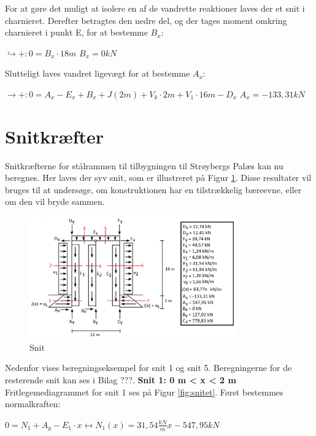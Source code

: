 For at gøre det muligt at isolere en af de vandrette reaktioner laves der et snit i charnieret. Derefter betragtes den nedre del, og der tages moment omkring charnieret i punkt E, for at bestemme $B_x$:
\begin{center}
	$\hookrightarrow+: 0 = B_x \cdot 18m$
	\newline
	$B_x = 0 kN$
\end{center}

Slutteligt laves vandret ligevægt for at bestemme $A_x$:
\begin{center}
	$\rightarrow+: 0 = A_x - E_x + B_x + J(2m) + V_k \cdot 2m + V_1 \cdot 16 m - D_x$
	\newline
	$A_x = -133,\!31 kN$
\end{center} 

\section{Snitkræfter}
Snitkræfterne for stålrammen til tilbygningen til Strøybergs Palæs kan nu beregnes. Her laves der syv snit, som er illustreret på Figur \ref{fig:snitbrud}. Disse resultater vil bruges til at undersøge, om konstruktionen har en tilstrækkelig bæreevne, eller om den vil bryde sammen. 

\begin{figure}[H]
	\centering
	\includegraphics[width=0.8\textwidth]{billeder/snitbrud.png}
	\caption{Snit}
	\label{fig:snitbrud}
\end{figure}

Nedenfor vises beregningseksempel for snit 1 og snit 5. Beregningerne for de resterende snit kan ses i Bilag ???. 
\newline
\newline
\textbf{Snit 1: 0 m < x < 2 m}
\newline
Fritlegemediagrammet for snit 1 ses på Figur \ref{fig:snitet}.
\newline
\newline
Først bestemmes normalkraften:
\begin{center}
	$0 = N_1 + A_y - E_1 \cdot x \leftrightarrow N_1(x) = 31,\!54 \frac{kN}{m} x - 547,\!95 kN $
\end{center}

